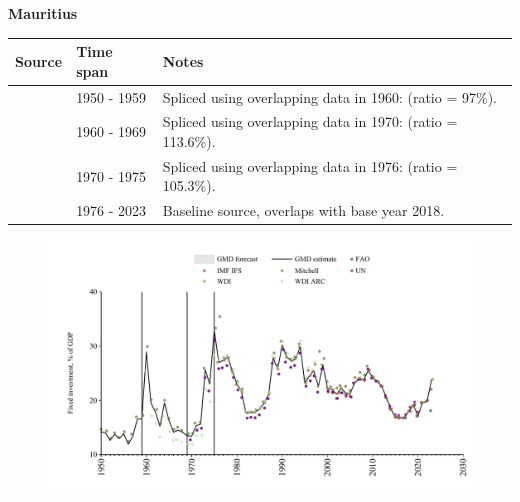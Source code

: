 \documentclass[12pt,a4paper,landscape]{article}
\begin{document}
\begin{adjustbox}{max totalsize={\paperwidth}{\paperheight},center}
\begin{minipage}[t][\textheight][t]{\textwidth}
\vspace*{0.5cm}
{}
\begin{center}
{\Large\bfseries Mauritius}
\end{center}
\vspace{0.5cm}
\begin{table}[H]
\centering
\small
\begin{tabular}{|l|l|l|}
\hline
\textbf{Source} & \textbf{Time span} & \textbf{Notes} \\
\hline
\rowcolor{white}\cite{Mitchell}& 1950 - 1959 &Spliced using overlapping data in 1960: (ratio = 97\%).\\
\rowcolor{lightgray}\cite{WDI_ARC}& 1960 - 1969 &Spliced using overlapping data in 1970: (ratio = 113.6\%).\\
\rowcolor{white}\cite{UN}& 1970 - 1975 &Spliced using overlapping data in 1976: (ratio = 105.3\%).\\
\rowcolor{lightgray}\cite{WDI}& 1976 - 2023 &Baseline source, overlaps with base year 2018.\\
\hline
\end{tabular}
\end{table}
\begin{figure}[H]
\centering
\includegraphics[width=\textwidth,height=0.6\textheight,keepaspectratio]{graphs/MUS_finv_GDP.pdf}
\end{figure}
\end{minipage}
\end{adjustbox}
\end{document}
